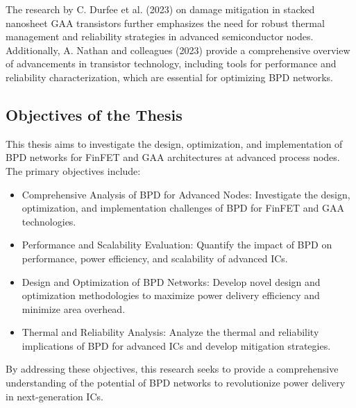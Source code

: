 The research by C. Durfee et al. (2023) on damage mitigation in stacked nanosheet GAA transistors further emphasizes the need for robust thermal management and reliability strategies in advanced semiconductor nodes. Additionally, A. Nathan and colleagues (2023) provide a comprehensive overview of advancements in transistor technology, including tools for performance and reliability characterization, which are essential for optimizing BPD networks.

\subsection{Objectives of the Thesis}
This thesis aims to investigate the design, optimization, and implementation of BPD networks for FinFET and GAA architectures at advanced process nodes. The primary objectives include:
\begin{itemize}
    \item Comprehensive Analysis of BPD for Advanced Nodes: Investigate the design, optimization, and implementation challenges of BPD for FinFET and GAA technologies.
    \item Performance and Scalability Evaluation: Quantify the impact of BPD on performance, power efficiency, and scalability of advanced ICs.
    \item Design and Optimization of BPD Networks: Develop novel design and optimization methodologies to maximize power delivery efficiency and minimize area overhead.
    \item Thermal and Reliability Analysis: Analyze the thermal and reliability implications of BPD for advanced ICs and develop mitigation strategies.
\end{itemize}
By addressing these objectives, this research seeks to provide a comprehensive understanding of the potential of BPD networks to revolutionize power delivery in next-generation ICs.
